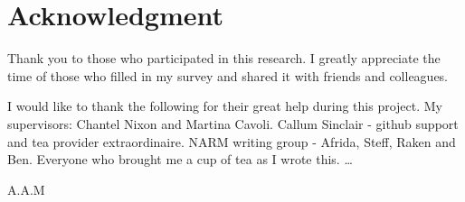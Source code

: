 \section*{Acknowledgment}
Thank you to those who participated in this research. I greatly appreciate the time of those who filled in my survey and shared it with friends and colleagues.

I would like to thank the following for their great help during this project. My supervisors: Chantel Nixon and Martina Cavoli. Callum Sinclair - github support and tea provider extraordinaire. NARM writing group - Afrida, Steff, Raken and Ben. Everyone who brought me a cup of tea as I wrote this. \ldots



\begin{flushright}
A.A.M\\[1pc]

\end{flushright}
